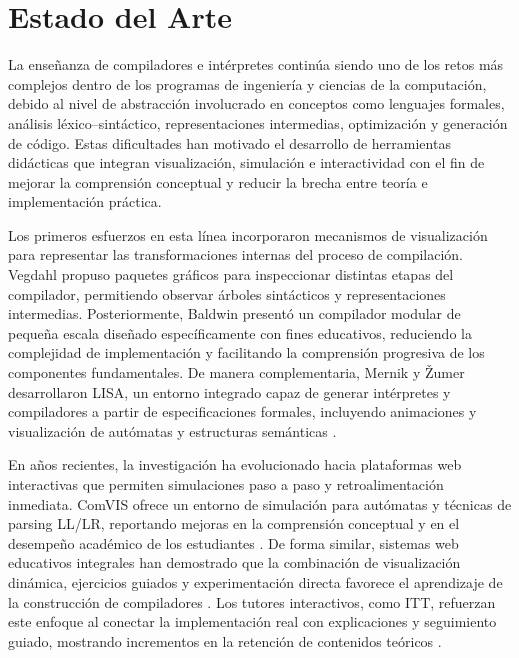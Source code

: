 \section{Estado del Arte}

La enseñanza de compiladores e intérpretes continúa siendo uno de los retos más complejos dentro de los programas de ingeniería y ciencias de la computación, debido al nivel de abstracción involucrado en conceptos como lenguajes formales, análisis léxico–sintáctico, representaciones intermedias, optimización y generación de código. Estas dificultades han motivado el desarrollo de herramientas didácticas que integran visualización, simulación e interactividad con el fin de mejorar la comprensión conceptual y reducir la brecha entre teoría e implementación práctica.

Los primeros esfuerzos en esta línea incorporaron mecanismos de visualización para representar las transformaciones internas del proceso de compilación. Vegdahl \cite{Vegdahl2000UsingVT} propuso paquetes gráficos para inspeccionar distintas etapas del compilador, permitiendo observar árboles sintácticos y representaciones intermedias. Posteriormente, Baldwin \cite{Baldwin2003ACompiler} presentó un compilador modular de pequeña escala diseñado específicamente con fines educativos, reduciendo la complejidad de implementación y facilitando la comprensión progresiva de los componentes fundamentales. De manera complementaria, Mernik y Žumer desarrollaron LISA, un entorno integrado capaz de generar intérpretes y compiladores a partir de especificaciones formales, incluyendo animaciones y visualización de autómatas y estructuras semánticas \cite{Mernik2003AnET}.

En años recientes, la investigación ha evolucionado hacia plataformas web interactivas que permiten simulaciones paso a paso y retroalimentación inmediata. ComVIS ofrece un entorno de simulación para autómatas y técnicas de parsing LL/LR, reportando mejoras en la comprensión conceptual y en el desempeño académico de los estudiantes \cite{jovanovic2021comvis}. De forma similar, sistemas web educativos integrales han demostrado que la combinación de visualización dinámica, ejercicios guiados y experimentación directa favorece el aprendizaje de la construcción de compiladores \cite{Stamenković2024AWE}. Los tutores interactivos, como ITT, refuerzan este enfoque al conectar la implementación real con explicaciones y seguimiento guiado, mostrando incrementos en la retención de contenidos teóricos \cite{delvado2023itt}.

